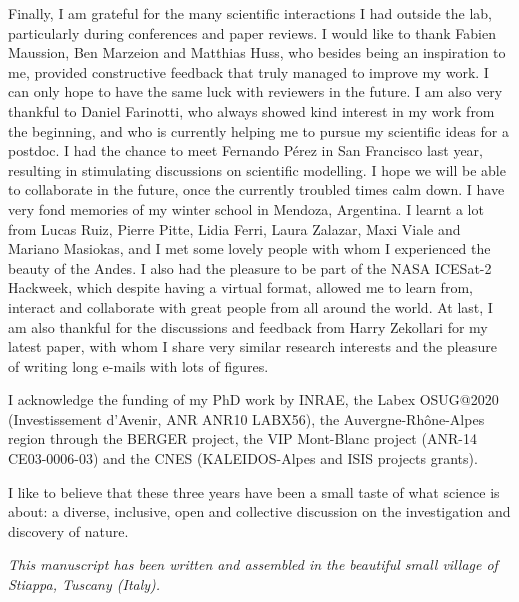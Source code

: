 Finally, I am grateful for the many scientific interactions I had outside the lab, particularly during conferences and paper reviews. I would like to thank Fabien Maussion, Ben Marzeion and Matthias Huss, who besides being an inspiration to me, provided constructive feedback that truly managed to improve my work. I can only hope to have the same luck with reviewers in the future. I am also very thankful to Daniel Farinotti, who always showed kind interest in my work from the beginning, and who is currently helping me to pursue my scientific ideas for a postdoc. I had the chance to meet Fernando Pérez in San Francisco last year, resulting in stimulating discussions on scientific modelling. I hope we will be able to collaborate in the future, once the currently troubled times calm down. I have very fond memories of my winter school in Mendoza, Argentina. I learnt a lot from Lucas Ruiz, Pierre Pitte, Lidia Ferri, Laura Zalazar, Maxi Viale and Mariano Masiokas, and I met some lovely people with whom I experienced the beauty of the Andes. I also had the pleasure to be part of the NASA ICESat-2 Hackweek, which despite having a virtual format, allowed me to learn from, interact and collaborate with great people from all around the world. At last, I am also thankful for the discussions and feedback from Harry Zekollari for my latest paper, with whom I share very similar research interests and the pleasure of writing long e-mails with lots of figures.

I acknowledge the funding of my PhD work by INRAE, the Labex OSUG@2020 (Investissement d'Avenir, ANR ANR10 LABX56), the Auvergne-Rhône-Alpes region through the BERGER project, the VIP Mont-Blanc project (ANR-14 CE03-0006-03) and the CNES (KALEIDOS-Alpes and ISIS projects grants).

I like to believe that these three years have been a small taste of what science is about: a diverse, inclusive, open and collective discussion on the investigation and discovery of nature. 

\bigskip
\bigskip
\bigskip
\bigskip

\begin{flushright}
\begin{small}
\textit{This manuscript has been written and assembled in the beautiful small village of Stiappa, Tuscany (Italy).}
\end{small}
\end{flushright}

